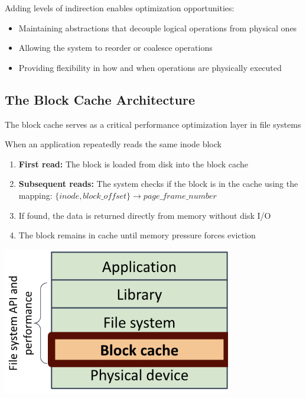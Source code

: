 \documentclass[../../compsys.tex]{subfiles}
\begin{document}
Adding levels of indirection enables optimization opportunities:
\begin{itemize}
  \item Maintaining abstractions that decouple logical operations from physical ones
  \item Allowing the system to reorder or coalesce operations
  \item Providing flexibility in how and when operations are physically executed
\end{itemize}
\newpage
\subsection{The Block Cache Architecture}
The block cache serves as a critical performance optimization layer in file systems\\[5px]

\begin{example}
\leavevmode
\upshape
\noindent When an application repeatedly reads the same inode block\\[9px]
\begin{minipage}{0.45\textwidth}
\begin{enumerate}
  \item \textbf{First read:} The block is loaded from disk into the block cache
  \item \textbf{Subsequent reads:} The system checks if the block is in the cache using the mapping:
  $\{inode, block\_offset\} \rightarrow page\_frame\_number$
  \item If found, the data is returned directly from memory without disk I/O
  \item The block remains in cache until memory pressure forces eviction
\end{enumerate}
\end{minipage}
\hfill
\vline
\hfill
\begin{minipage}{0.45\textwidth}
  \begin{center}
    \includegraphics[width=0.75\textwidth]{chapters/L7/images/layers.png}
  \end{center}
\end{minipage}
\end{example}
\vspace{10px}
\end{document}
